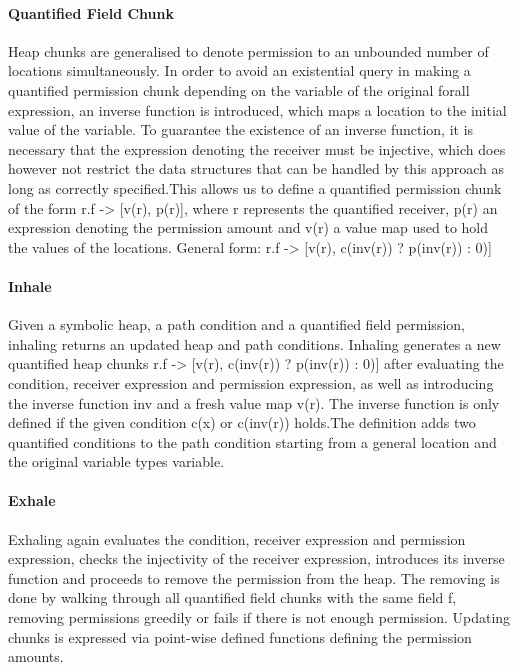 \documentclass[12pt]{article}
\begin{document}
\paragraph{Quantified Field Chunk}
Heap chunks are generalised to denote permission to an unbounded number of locations simultaneously.
In order to avoid an existential query in making a quantified permission chunk depending on the variable of the original forall expression, an inverse function is introduced, which maps a location to the initial value of the variable. To guarantee the existence of an inverse function, it is necessary that the expression denoting the receiver must be injective, which does however not restrict the data structures that can be handled by this approach as long as correctly specified.This allows us to define a quantified permission chunk of the form r.f -> [v(r), p(r)], where r represents the quantified receiver, p(r) an expression denoting the permission amount and v(r) a value map used to hold the values of the locations.
General form: r.f -> [v(r), c(inv(r)) ? p(inv(r)) : 0)]

\paragraph{Inhale}
Given a symbolic heap, a path condition and a quantified field permission, inhaling returns an updated heap and path conditions.
Inhaling generates a new quantified heap chunks  r.f -> [v(r), c(inv(r)) ? p(inv(r)) : 0)] after evaluating the condition, receiver expression and permission expression, as well as introducing the inverse function inv and a fresh value map v(r).
The inverse function is only defined if the given condition c(x) or c(inv(r)) holds.The definition adds two quantified conditions to the path condition starting from a general location and the original variable types variable.


\paragraph{Exhale}
Exhaling again evaluates the condition, receiver expression and permission expression, checks the injectivity of the receiver expression, introduces its inverse function and proceeds to remove the permission from the heap.
The removing is done by walking through all quantified field chunks with the same field f, removing permissions greedily or fails if there is not enough permission. Updating chunks is expressed via point-wise defined functions defining the permission amounts.
\end{document}
